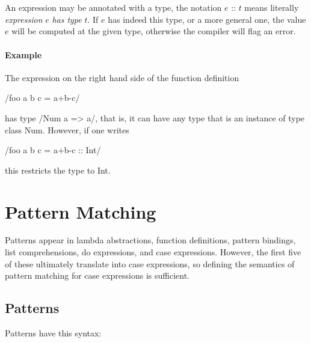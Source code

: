 \begin{flushleft}
  \sym{::}  \alt{} \\
  \alt{}  \alt{}  \alt{}  \alt{}  \\
\end{flushleft}

An expression may be annotated with a type, the notation $e$ :: $t$ means literally \emph{expression} $e$ \emph{has type} $t$. If $e$ has indeed this type, or a more general one, the value $e$ will be computed at the given type, otherwise the compiler will flag an error.

\paragraph{Example}
The expression on the right hand side of the function definition

\exq/foo a b c = a+b-c/

has type 
\ex/Num a => a/, that is, it can have any type that is an instance of type class Num. However, if one writes

\exq/foo a b c = a+b-c :: Int/

this restricts the type to Int.



\section{Pattern Matching} \label{patternmatch}  

Patterns appear in lambda abstractions, function definitions, pattern bindings, list comprehensions, do expressions, and case expressions. However, the first five of these ultimately translate into case expressions, so defining the semantics of pattern matching for case expressions is sufficient.

\subsection{Patterns} \label{patterns} 

Patterns have this syntax:

